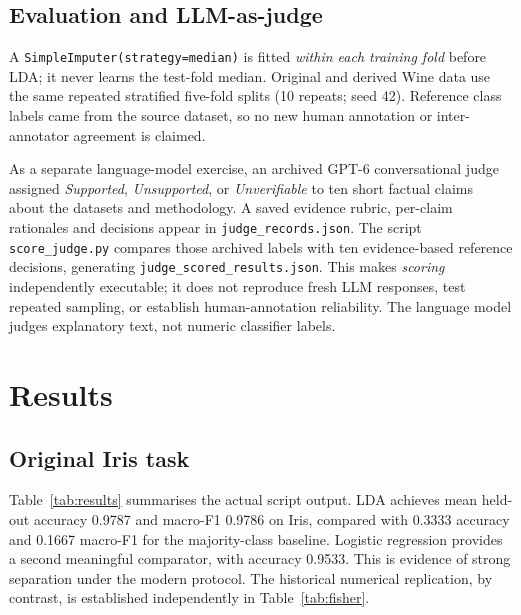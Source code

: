 \documentclass[11pt]{article}
\begin{document}
\subsection{Evaluation and LLM-as-judge}
A \texttt{SimpleImputer(strategy=median)} is fitted \emph{within each training fold} before LDA; it never learns the test-fold median. Original and derived Wine data use the same repeated stratified five-fold splits (10 repeats; seed 42). Reference class labels came from the source dataset, so no new human annotation or inter-annotator agreement is claimed.

As a separate language-model exercise, an archived GPT-6 conversational judge assigned \emph{Supported}, \emph{Unsupported}, or \emph{Unverifiable} to ten short factual claims about the datasets and methodology. A saved evidence rubric, per-claim rationales and decisions appear in \texttt{judge\_records.json}. The script \texttt{score\_judge.py} compares those archived labels with ten evidence-based reference decisions, generating \texttt{judge\_scored\_results.json}. This makes \emph{scoring} independently executable; it does not reproduce fresh LLM responses, test repeated sampling, or establish human-annotation reliability. The language model judges explanatory text, not numeric classifier labels.

\section{Results}
\subsection{Original Iris task}
Table~\ref{tab:results} summarises the actual script output. LDA achieves mean held-out accuracy 0.9787 and macro-F1 0.9786 on Iris, compared with 0.3333 accuracy and 0.1667 macro-F1 for the majority-class baseline. Logistic regression provides a second meaningful comparator, with accuracy 0.9533. This is evidence of strong separation under the modern protocol. The historical numerical replication, by contrast, is established independently in Table~\ref{tab:fisher}.
\end{document}
